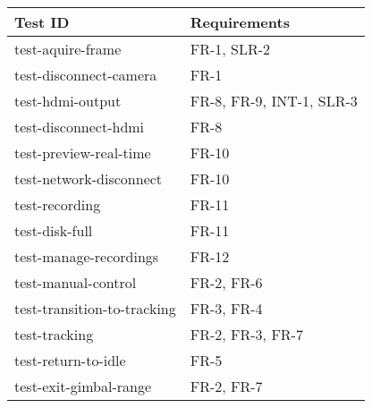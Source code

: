\documentclass[12pt, titlepage]{article}
\begin{document}
\begin{tabularx}{\textwidth}{p{5cm}X}
  \toprule {\bf Test ID}       & {\bf Requirements}                                                                                \\
  \midrule
  test-aquire-frame            & FR-1, SLR-2                                                                                       \\
  test-disconnect-camera       & FR-1                                                                                              \\
  test-hdmi-output             & FR-8, FR-9, INT-1, SLR-3                                                                          \\
  test-disconnect-hdmi         & FR-8                                                                                              \\
  test-preview-real-time       & FR-10                                                                                             \\
  test-network-disconnect      & FR-10                                                                                             \\
  test-recording               & FR-11                                                                                             \\
  test-disk-full               & FR-11                                                                                             \\
  test-manage-recordings       & FR-12                                                                                             \\
  test-manual-control          & FR-2, FR-6                                                                                        \\
  test-transition-to-tracking  & FR-3, FR-4                                                                                        \\
  test-tracking                & FR-2, FR-3, FR-7                                                                                  \\
  test-return-to-idle          & FR-5                                                                                              \\
  test-exit-gimbal-range       & FR-2, FR-7                                                                                        \\

\end{tabularx}
\end{document}

